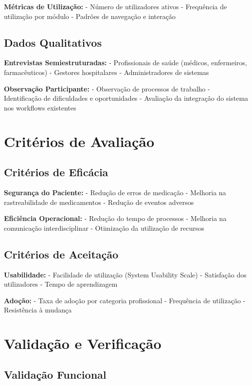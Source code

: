 \textbf{Métricas de Utilização:}
- Número de utilizadores ativos
- Frequência de utilização por módulo
- Padrões de navegação e interação

\subsection{Dados Qualitativos}

\textbf{Entrevistas Semiestruturadas:}
- Profissionais de saúde (médicos, enfermeiros, farmacêuticos)
- Gestores hospitalares
- Administradores de sistemas

\textbf{Observação Participante:}
- Observação de processos de trabalho
- Identificação de dificuldades e oportunidades
- Avaliação da integração do sistema nos workflows existentes

\section{Critérios de Avaliação}

\subsection{Critérios de Eficácia}

\textbf{Segurança do Paciente:}
- Redução de erros de medicação \cite{ciapponi2021}
- Melhoria na rastreabilidade de medicamentos
- Redução de eventos adversos

\textbf{Eficiência Operacional:}
- Redução do tempo de processos
- Melhoria na comunicação interdisciplinar
- Otimização da utilização de recursos

\subsection{Critérios de Aceitação}

\textbf{Usabilidade:}
- Facilidade de utilização (System Usability Scale)
- Satisfação dos utilizadores
- Tempo de aprendizagem

\textbf{Adoção:}
- Taxa de adoção por categoria profissional
- Frequência de utilização
- Resistência à mudança \cite{venkatesh2003}

\section{Validação e Verificação}

\subsection{Validação Funcional}

